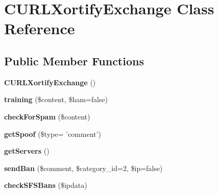 \hypertarget{class_c_u_r_l_xortify_exchange}{\section{C\-U\-R\-L\-Xortify\-Exchange Class Reference}
\label{class_c_u_r_l_xortify_exchange}
}
\subsection*{Public Member Functions}
\begin{DoxyCompactItemize}
\item 
\hypertarget{class_c_u_r_l_xortify_exchange_ade45f177ae0902dfcf37a0dc233e0037}{{\bfseries C\-U\-R\-L\-Xortify\-Exchange} ()}\label{class_c_u_r_l_xortify_exchange_ade45f177ae0902dfcf37a0dc233e0037}

\item 
\hypertarget{class_c_u_r_l_xortify_exchange_aedf5f577384dce3654868f06d58f3548}{{\bfseries training} (\$content, \$ham=false)}\label{class_c_u_r_l_xortify_exchange_aedf5f577384dce3654868f06d58f3548}

\item 
\hypertarget{class_c_u_r_l_xortify_exchange_a977b1bcffa94c71cfc3b43de93ab598f}{{\bfseries check\-For\-Spam} (\$content)}\label{class_c_u_r_l_xortify_exchange_a977b1bcffa94c71cfc3b43de93ab598f}

\item 
\hypertarget{class_c_u_r_l_xortify_exchange_a5c8a02ad368e1608f97bec8a775f2f1f}{{\bfseries get\-Spoof} (\$type= 'comment')}\label{class_c_u_r_l_xortify_exchange_a5c8a02ad368e1608f97bec8a775f2f1f}

\item 
\hypertarget{class_c_u_r_l_xortify_exchange_ae109cbb5d7c70b8e175fe6dab3d072d4}{{\bfseries get\-Servers} ()}\label{class_c_u_r_l_xortify_exchange_ae109cbb5d7c70b8e175fe6dab3d072d4}

\item 
\hypertarget{class_c_u_r_l_xortify_exchange_a6298182837b7465dd915d5d6962905b8}{{\bfseries send\-Ban} (\$comment, \$category\-\_\-id=2, \$ip=false)}\label{class_c_u_r_l_xortify_exchange_a6298182837b7465dd915d5d6962905b8}

\item 
\hypertarget{class_c_u_r_l_xortify_exchange_a0b01f937a7575bb403ee5997f67632ae}{{\bfseries check\-S\-F\-S\-Bans} (\$ipdata)}\label{class_c_u_r_l_xortify_exchange_a0b01f937a7575bb403ee5997f67632ae}


\end{DoxyCompactItemize}
